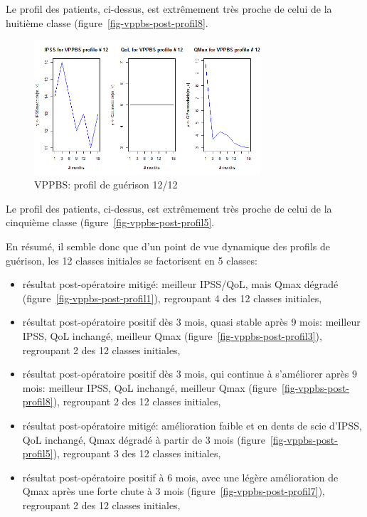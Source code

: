 Le profil des patients, ci-dessus, est extrêmement très proche de celui de la huitième classe (figure~\ref{fig-vppbs-post-profil8}.


\begin{figure}[H]
\centering
\includegraphics[width=0.75\textwidth]{../Fig/VPPBS/vppbs-profil-post-12.png}
\caption{VPPBS: profil de guérison 12/12}
\label{fig-vppbs-post-profil12}
\end{figure}

Le profil des patients, ci-dessus, est extrêmement très proche de celui de la cinquième classe (figure~\ref{fig-vppbs-post-profil5}.

En résumé, il semble donc que d'un point de vue dynamique des profils de guérison, les 12 classes initiales se factorisent en 5 classes:
\begin{itemize}
\item résultat post-opératoire mitigé: meilleur IPSS/QoL, mais Qmax dégradé (figure~\ref{fig-vppbs-post-profil1}), regroupant 4 des 12 classes initiales,
\item résultat post-opératoire positif dès 3 mois, quasi stable après 9 mois: meilleur IPSS, QoL inchangé, meilleur Qmax (figure~\ref{fig-vppbs-post-profil3}), regroupant 2 des 12 classes initiales,
\item résultat post-opératoire positif dès 3 mois, qui continue à s'améliorer après 9 mois: meilleur IPSS, QoL inchangé, meilleur Qmax (figure~\ref{fig-vppbs-post-profil8}), regroupant 2 des 12 classes initiales,
\item résultat post-opératoire mitigé: amélioration faible et en dents de scie d'IPSS, QoL inchangé, Qmax dégradé à partir de 3 mois (figure~\ref{fig-vppbs-post-profil5}), regroupant 3 des 12 classes initiales,
\item résultat post-opératoire positif à 6 mois, avec une légère amélioration de Qmax après une forte chute à 3 mois (figure~\ref{fig-vppbs-post-profil7}), regroupant 2 des 12 classes initiales,
\end{itemize}

